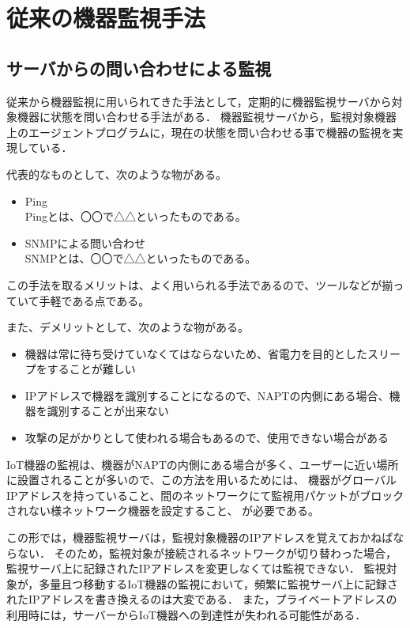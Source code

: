 \section{従来の機器監視手法}
\subsection{サーバからの問い合わせによる監視}
	従来から機器監視に用いられてきた手法として，定期的に機器監視サーバから対象機器に状態を問い合わせる手法がある．
	機器監視サーバから，監視対象機器上のエージェントプログラムに，現在の状態を問い合わせる事で機器の監視を実現している．
	\medskip

	代表的なものとして、次のような物がある。
	\begin{itemize}
		\item Ping\\
			Pingとは、〇〇で△△といったものである。
		\item SNMPによる問い合わせ\\
			SNMPとは、〇〇で△△といったものである。
	\end{itemize}
	
	この手法を取るメリットは、よく用いられる手法であるので、ツールなどが揃っていて手軽である点である。
	
	また、デメリットとして、次のような物がある。
	\begin{itemize}
		\item 機器は常に待ち受けていなくてはならないため、省電力を目的としたスリープをすることが難しい
		\item IPアドレスで機器を識別することになるので、NAPTの内側にある場合、機器を識別することが出来ない
		\item 攻撃の足がかりとして使われる場合もあるので、使用できない場合がある
	\end{itemize}

	IoT機器の監視は、機器がNAPTの内側にある場合が多く、ユーザーに近い場所に設置されることが多いので、この方法を用いるためには、
	機器がグローバルIPアドレスを持っていること、間のネットワークにて監視用パケットがブロックされない様ネットワーク機器を設定すること、
	が必要である。

	この形では，機器監視サーバは，監視対象機器のIPアドレスを覚えておかねばならない．
	そのため，監視対象が接続されるネットワークが切り替わった場合，監視サーバ上に記録されたIPアドレスを変更しなくては監視できない．
	監視対象が，多量且つ移動するIoT機器の監視において，頻繁に監視サーバ上に記録されたIPアドレスを書き換えるのは大変である．
	また，プライベートアドレスの利用時には，サーバーからIoT機器への到達性が失われる可能性がある．

